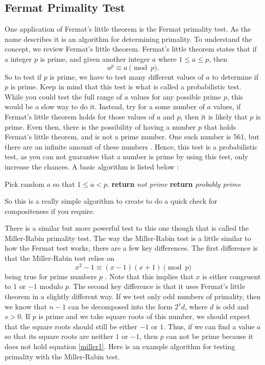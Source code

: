 \documentclass[11pt]{article}
\begin{document}
\subsection*{Fermat Primality Test}
One application of Fermat's little theorem is the Fermat primality test.
As the name describes it is an algorithm for determining primality.
To understand the concept, we review Fermat's little theorem.
Fermat's little theorem states that if a integer $p$ is prime, and given
another integer $a$ where $1 \le a \le p$, then \[a^p \equiv a \pmod{p}. \]
So to test if $p$ is prime, we have to test many different values of $a$ to 
determine if $p$ is prime.
Keep in mind that this test is what is called a probabilistic test.
While you could test the full range of $a$ values for any possible prime $p$,
this would be a slow way to do it.
Instead, try for a some number of $a$ values, if Fermat's little theorem holds
for those values of $a$ and $p$, then it is likely that $p$ is prime.
Even then, there is the possibility of having a number $p$ that holds 
Fermat's little theorem, and is not a prime number.
One such number is 561, but there are an infinite amount of these
numbers \cite{FermatTest}.
Hence, this test is a probabilistic test, as you can not guarantee that a number
is prime by using this test, only increase the chances.
A basic algorithm is listed below \cite{FermatTest}:

\begin{algorithm}
\begin{algorithmic}[0]
            \State Pick random $a$ so that $1 \le a < p$.
            \State \textbf{return} \emph{not prime}
            \EndIf
        \EndFor
        \State \textbf{return} \emph{probably prime}
    \EndProcedure
\end{algorithmic}
\end{algorithm}

So this is a really simple algorithm to create to do a quick check for 
compositeness if you require.

There is a similar but more powerful test to this one though that is
called the Miller-Rabin primality test.
The way the Miller-Rabin test is a little similar to how the Fermat test works,
there are a few key differences.
The first difference is that the Miller-Rabin test relies on
\begin{equation}
    x^2 -1 \equiv (x-1)(x+1) \pmod{p} \label{miller1}
\end{equation}
being true for prime numbers $p$ \cite{Miller}.
Note that this implies that $x$ is either congruent to $1$ or $-1$ modulo $p$.
The second key difference is that it uses Fermat's little theorem in a slightly
different way.
If we test only odd numbers of primality, then we know that $n-1$ can be
decomposed into the form $2^sd$, where $d$ is odd and $s >0$.
If $p$ is prime and we take square roots of this number, we should expect that
the square roots should still be either $-1$ or $1$.
Thus, if we can find a value $a$ so that its square roots are neither $1$ or $-1$,
then $p$ can not be prime because it does not hold equation \eqref{miller1}.
Here is an example algorithm for testing primality with the Miller-Rabin test.
\end{document}
